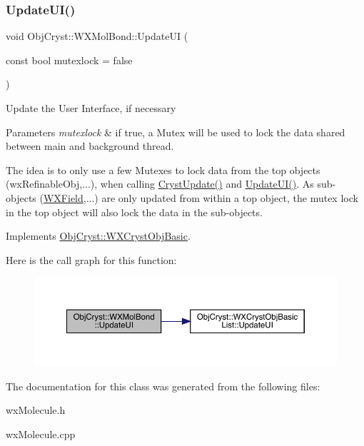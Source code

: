 \subsubsection{\texorpdfstring{UpdateUI()}{UpdateUI()}}
{\footnotesize\ttfamily void Obj\+Cryst\+::\+W\+X\+Mol\+Bond\+::\+Update\+UI (\begin{DoxyParamCaption}\item[{const bool}]{mutexlock = {\ttfamily false} }\end{DoxyParamCaption})\hspace{0.3cm}{\ttfamily [virtual]}}

Update the User Interface, if necessary


\begin{DoxyParams}{Parameters}
{\em mutexlock} & if true, a Mutex will be used to lock the data shared between main and background thread.\\
\hline
\end{DoxyParams}
The idea is to only use a few Mutexes to lock data from the top objects (wx\+Refinable\+Obj,...), when calling \mbox{\hyperlink{class_obj_cryst_1_1_w_x_mol_bond_a789742bc7494c3ffddda46e1b91cff54}{Cryst\+Update()}} and \mbox{\hyperlink{class_obj_cryst_1_1_w_x_mol_bond_a75806846321a0254b833f8ff8400bc0f}{Update\+U\+I()}}. As sub-\/objects (\mbox{\hyperlink{class_obj_cryst_1_1_w_x_field}{W\+X\+Field}},...) are only updated from within a top object, the mutex lock in the top object will also lock the data in the sub-\/objects. 

Implements \mbox{\hyperlink{class_obj_cryst_1_1_w_x_cryst_obj_basic_a3818940b7031ff7e45cf2178c4a99c90}{Obj\+Cryst\+::\+W\+X\+Cryst\+Obj\+Basic}}.

Here is the call graph for this function\+:
\nopagebreak
\begin{figure}[H]
\begin{center}
\leavevmode
\includegraphics[width=350pt]{class_obj_cryst_1_1_w_x_mol_bond_a75806846321a0254b833f8ff8400bc0f_cgraph}
\end{center}
\end{figure}


The documentation for this class was generated from the following files\+:\begin{DoxyCompactItemize}
\item 
wx\+Molecule.\+h\item 
wx\+Molecule.\+cpp\end{DoxyCompactItemize}
